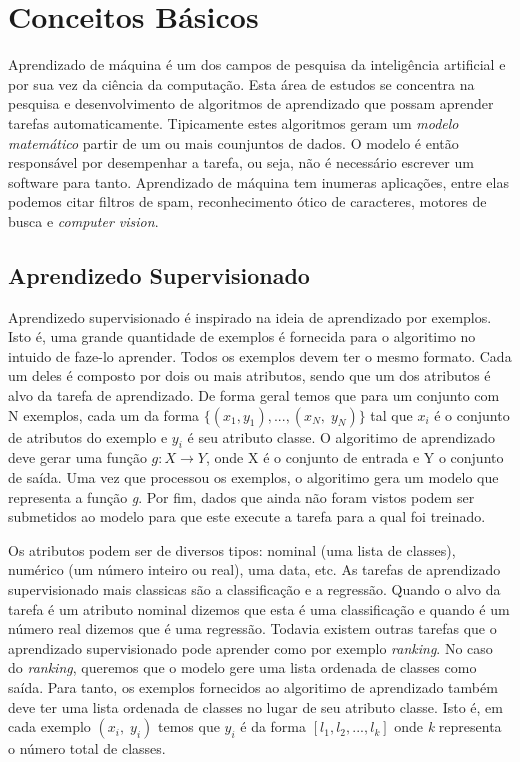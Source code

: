 \chapter{Conceitos Básicos}

Aprendizado de máquina é um dos campos de pesquisa da inteligência artificial e por sua vez da ciência da computação.
Esta área de estudos se concentra na pesquisa e desenvolvimento de algoritmos de aprendizado que possam aprender tarefas automaticamente.
Tipicamente estes algoritmos geram um \textit{modelo matemático} partir de um ou mais counjuntos de dados.
O modelo é então responsável por desempenhar a tarefa, ou seja, não é necessário escrever um software para tanto.
Aprendizado de máquina tem inumeras aplicações, entre elas podemos citar filtros de spam, reconhecimento ótico de caracteres, motores de busca e \textit{computer vision}.

\section{Aprendizedo Supervisionado}

Aprendizedo supervisionado é inspirado na ideia de aprendizado por exemplos.
Isto é, uma grande quantidade de exemplos é fornecida para o algoritimo no intuido de faze-lo aprender.
Todos os exemplos devem ter o mesmo formato.
Cada um deles é composto por dois ou mais atributos, sendo que um dos atributos é alvo da tarefa de aprendizado.
De forma geral temos que para um conjunto com N exemplos, cada um da forma $ \{(x_1, y_1), ..., (x_N,\; y_N)\} $ tal que $x_i$ é o conjunto de atributos do exemplo e $y_i$ é seu atributo classe.
O algoritimo de aprendizado deve gerar uma função $g: X \to Y$, onde X é o conjunto de entrada e Y o conjunto de saída.
Uma vez que processou os exemplos, o algoritimo gera um modelo que representa a função \textit{g}.
Por fim, dados que ainda não foram vistos podem ser submetidos ao modelo para que este execute a tarefa para a qual foi treinado.



Os atributos podem ser de diversos tipos: nominal (uma lista de classes), numérico (um número inteiro ou real), uma data, etc.
As tarefas de aprendizado supervisionado mais classicas são a classificação e a regressão.
Quando o alvo da tarefa é um atributo nominal dizemos que esta é uma classificação e quando é um número real dizemos que é uma regressão.
Todavia existem outras tarefas que o aprendizado supervisionado pode aprender como por exemplo \textit{ranking}.
No caso do \textit{ranking}, queremos que o modelo gere uma lista ordenada de classes como saída.
Para tanto, os exemplos fornecidos ao algoritimo de aprendizado também deve ter uma lista ordenada de classes no lugar de seu atributo classe.
Isto é, em cada exemplo $ (x_i,\; y_i) $ temos que $y_i$ é da forma $ [l_1, l_2, ..., l_k] $ onde \textit{k} representa o número total de classes.

